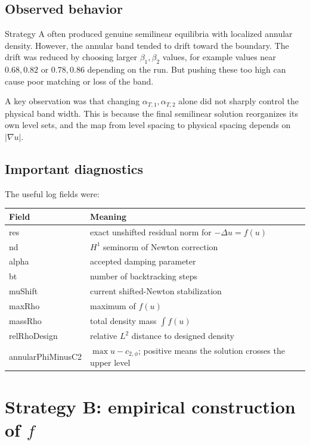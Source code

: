\documentclass[11pt,a4paper]{article}
\begin{document}
\subsection{Observed behavior}

Strategy A often produced genuine semilinear equilibria with localized annular density. However, the annular band tended to drift toward the boundary. The drift was reduced by choosing larger $\beta_1,\beta_2$ values, for example values near $0.68,0.82$ or $0.78,0.86$ depending on the run. But pushing these too high can cause poor matching or loss of the band.

A key observation was that changing $\alpha_{T,1},\alpha_{T,2}$ alone did not sharply control the physical band width. This is because the final semilinear solution reorganizes its own level sets, and the map from level spacing to physical spacing depends on $|\nabla u|$.

\subsection{Important diagnostics}

The useful log fields were:
\begin{center}
\begin{tabular}{>{\ttfamily}p{}p{}}
\toprule
Field & Meaning\\
\midrule
res & exact unshifted residual norm for $-\Delta u=f(u)$\\
nd & $H^1$ seminorm of Newton correction\\
alpha & accepted damping parameter\\
bt & number of backtracking steps\\
muShift & current shifted-Newton stabilization\\
maxRho & maximum of $f(u)$\\
massRho & total density mass $\int f(u)$\\
relRhoDesign & relative $L^2$ distance to designed density\\
annularPhiMinusC2 & $\max u-c_{2,\phi}$; positive means the solution crosses the upper level\\
\bottomrule
\end{tabular}
\end{center}

\section{Strategy B: empirical construction of $f$}
\end{document}
